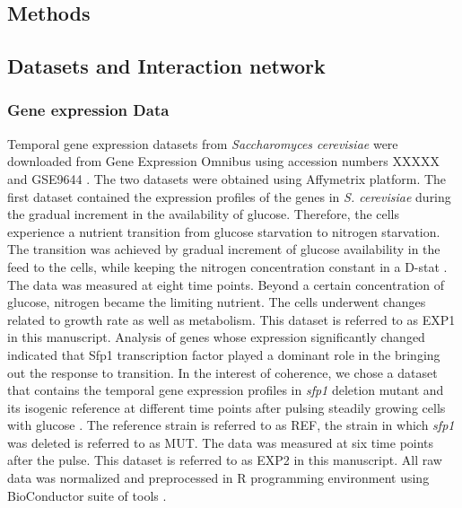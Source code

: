 \documentclass{bioinfo}
\begin{document}
\begin{methods}
\section{Methods}
\label{sec:methods}
\subsection{Datasets and Interaction network}
\subsubsection{Gene expression Data}
\label{sec:gene-expression-data}
 Temporal gene expression datasets from {\it Saccharomyces cerevisiae} were downloaded from Gene
 Expression Omnibus using accession numbers XXXXX and GSE9644 . The two
 datasets were obtained using Affymetrix platform. The first dataset
 contained the expression profiles of the genes in {\it S. cerevisiae}
 during the gradual increment in the availability of glucose. Therefore, the cells experience a nutrient transition from glucose starvation 
 to nitrogen starvation. The transition was achieved by
 gradual increment of glucose availability in the feed to the cells,
 while keeping the nitrogen concentration constant in a D-stat
 \citep{Farzadfard2010}. The data was measured at eight time points. Beyond a certain concentration of glucose,
 nitrogen became the limiting nutrient. The cells underwent changes
 related to growth rate as well as metabolism. This dataset is referred to as EXP1 in this manuscript.
 Analysis of genes whose  expression significantly changed indicated that Sfp1 transcription
 factor played a dominant role in the bringing out the response to
 transition. In the interest of coherence, we chose a dataset that
 contains the temporal gene expression profiles in {\it sfp1} deletion
 mutant and its isogenic reference at different time points after
 pulsing steadily growing cells with glucose \citep{Cipollina2008}. The reference strain is referred to as REF, the strain in which {\it sfp1} was deleted is referred to as MUT. The data was measured at
 six time points after the pulse. This dataset is referred to as EXP2 in this manuscript. All raw data was normalized and preprocessed in R programming environment using BioConductor suite of tools \citep{Gentleman2004}.


\end{methods}
\end{document}
